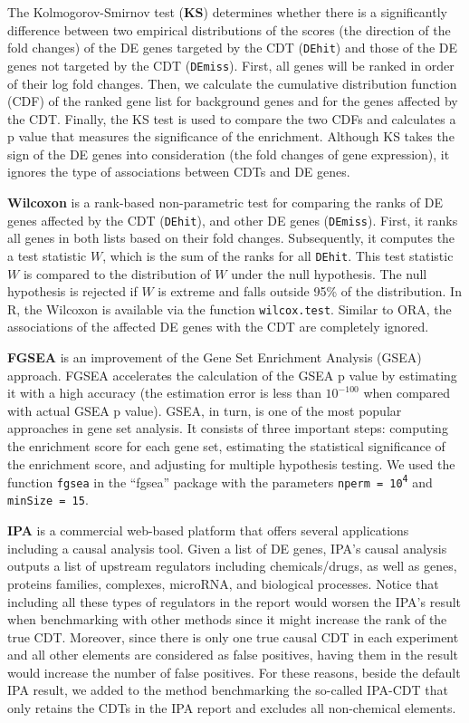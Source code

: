 The Kolmogorov-Smirnov test (\textbf{KS}) determines whether there is a significantly difference between two empirical distributions of the scores (the direction of the fold changes) of the DE genes targeted by the CDT (\texttt{DEhit}) and those of the DE genes not targeted by the CDT (\texttt{DEmiss}). First, all genes will be ranked in order of their log fold changes. Then, we calculate the cumulative distribution function (CDF) of the ranked gene list for background genes and for the genes affected by the CDT. Finally, the KS test is used to compare the two CDFs and calculates a p value that measures the significance of the enrichment. Although KS takes the sign of the DE genes into consideration (the fold changes of gene expression), it ignores the type of associations between CDTs and DE genes.

\textbf{Wilcoxon} is a rank-based non-parametric test for comparing the ranks of DE genes affected by the CDT (\texttt{DEhit}), and other DE genes (\texttt{DEmiss}). First, it ranks all genes in both lists based on their fold changes. Subsequently, it computes the a test statistic $W$, which is the sum of the ranks for all \texttt{DEhit}. This test statistic $W$ is compared to the distribution of $W$ under the null hypothesis. The null hypothesis is rejected if $W$ is extreme and falls outside 95\% of the distribution. In R, the Wilcoxon is available via the function \texttt{wilcox.test}.  Similar to ORA, the  associations of the affected DE genes with the CDT are completely ignored.

\textbf{FGSEA} is an improvement of the Gene Set Enrichment Analysis (GSEA) approach. FGSEA accelerates the calculation of the GSEA p value by estimating it with a high accuracy (the estimation error is less than $10^{-100}$ when compared with actual GSEA p value). GSEA, in turn, is one of the most popular approaches in gene set analysis\cite{Subramanian:2005}. It consists of three important steps: computing the enrichment score for each gene set, estimating the statistical significance of the enrichment score, and adjusting for multiple hypothesis testing. We used the function \texttt{fgsea} in the ``fgsea'' package with the parameters \texttt{nperm = 10\textsuperscript{4}} and \texttt{minSize = 15}.

\textbf{IPA} is a commercial web-based platform that offers several applications including a causal analysis tool\cite{kramer2013causal}. Given a list of DE genes, IPA's causal analysis outputs a list of upstream regulators including chemicals/drugs, as well as genes, proteins families, complexes, microRNA, and biological processes.
Notice that including all these types of regulators in the report would worsen the IPA's result when benchmarking with other methods since it might increase the rank of the true CDT. Moreover, since there is only one true causal CDT in each experiment and all other elements are considered as false positives, having them in the result would increase the number of false positives. 
For these reasons, beside the default IPA result, we added to the method benchmarking the so-called IPA-CDT  that only retains the CDTs in the IPA report and excludes all non-chemical elements.

